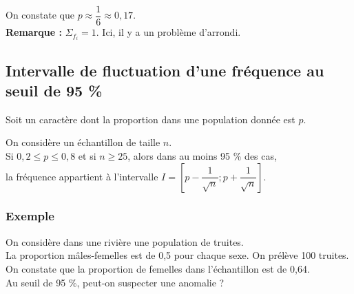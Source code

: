 \vspace*{.3cm}

On constate que $p \approx \dfrac{1}{6} \approx 0,17$. \\

\textbf{Remarque :} $\Sigma_{f_i} = 1$. Ici, il y a un problème d'arrondi. 

\begin{center}
\end{center}

\newpage

\subsection{Intervalle de fluctuation d'une fréquence au seuil de 95  \%}

Soit un caractère dont la proportion dans une population donnée est $p$.  

On considère un échantillon de taille $n$. \\

Si $0,2\leq p \leq 0,8$ et si $n \geq 25$, alors dans au moins 95  \% des cas, \\
la fréquence appartient à l'intervalle $I = \left[p - \dfrac{1}{\sqrt{n}} ; p + \dfrac{1}{\sqrt{n}}\right]$.

\subsubsection{Exemple }

On considère dans une rivière une population de truites. \\ La proportion mâles-femelles est de 0,5 pour chaque sexe. On prélève 100 truites. \\
On constate que la proportion de femelles dans l'échantillon est de 0,64. \\
Au seuil de 95  \%, peut-on suspecter une anomalie ? \\

